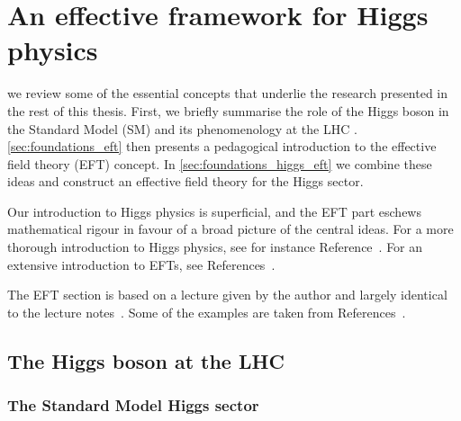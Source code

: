 




\chapter{An effective framework for Higgs physics}
\label{chapter:foundations}

 we review some of the essential concepts
that underlie the research presented in the rest of this
thesis. First, we briefly summarise the role of the Higgs boson in the
Standard Model (SM) and its phenomenology at the LHC .
\autoref{sec:foundations_eft} then presents a pedagogical introduction
to the effective field theory (EFT) concept. In
\autoref{sec:foundations_higgs_eft} we combine these ideas and
construct an effective field theory for the Higgs sector.

Our introduction to Higgs physics is superficial, and the EFT part
eschews mathematical rigour in favour of a broad picture of the
central ideas. For a more thorough introduction to Higgs physics, see
for instance Reference~\cite{Plehn:2009nd}. For an extensive
introduction to EFTs, see References~\cite{Georgi:1994qn,
  Kaplan:2005es}.

The EFT section is based on a lecture given by the author and largely
identical to the lecture notes~\cite{Brehmer:EFTlecture}. Some of the
examples are taken from References~\cite{Georgi:1994qn,
  Kaplan:2005es}.



\section{The Higgs boson at the LHC}
\label{sec:foundations_Higgs}


\subsection{The Standard Model Higgs sector}

